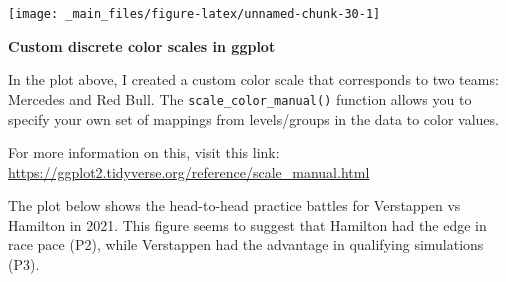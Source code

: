 \documentclass[
]{book}
\begin{document}
\begin{center}\texttt{[image: \_main\_files/figure-latex/unnamed-chunk-30-1]} \end{center}

\begin{blackbox}

\begin{center}
\textbf{Custom discrete color scales in ggplot}

\end{center}

In the plot above, I created a custom color scale that corresponds to two teams: Mercedes and Red Bull. The \texttt{scale\_color\_manual()} function allows you to specify your own set of mappings from levels/groups in the data to color values.

For more information on this, visit this link: \url{https://ggplot2.tidyverse.org/reference/scale_manual.html}

\end{blackbox}

The plot below shows the head-to-head practice battles for Verstappen vs Hamilton in 2021. This figure seems to suggest that Hamilton had the edge in race pace (P2), while Verstappen had the advantage in qualifying simulations (P3).
\end{document}
